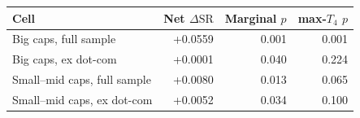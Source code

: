 \begin{tabular}{lrrr}
\toprule
Cell & Net $\Delta\mathrm{SR}$ & Marginal $p$ & max-$T_4$ $p$ \\
\midrule
Big caps, full sample & +0.0559 & 0.001 & 0.001 \\
Big caps, ex dot-com & +0.0001 & 0.040 & 0.224 \\
Small--mid caps, full sample & +0.0080 & 0.013 & 0.065 \\
Small--mid caps, ex dot-com & +0.0052 & 0.034 & 0.100 \\
\bottomrule
\end{tabular}
